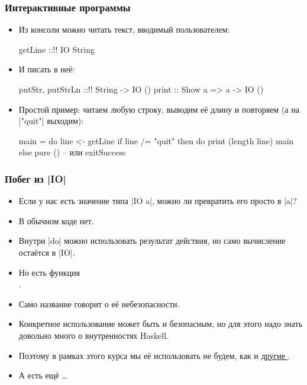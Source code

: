 \documentclass[11pt]{beamer}
\begin{document}
\begin{frame}[fragile]
  \frametitle{Интерактивные программы}
  \begin{itemize}
    \item Из консоли можно читать текст, вводимый пользователем:
          \begin{haskell}
            getLine ::!\pause! IO String
          \end{haskell}
    \item И писать в неё:
          \begin{haskell}
            putStr, putStrLn ::!\pause! String -> IO ()
            print :: Show a => a -> IO () 
          \end{haskell}
          \pause
    \item Простой пример: читаем любую строку, выводим её длину и повторяем (а на \haskinline|"quit"| выходим):
          \pause
          \begin{haskellsmall}
            main = do
              line <- getLine
              if line /= "quit"
                then do
                  print (length line)
                  main
                else
                  pure ()  -- или exitSuccess
          \end{haskellsmall}
  \end{itemize}
\end{frame}

\begin{frame}[fragile]
  \frametitle{Побег из \haskinline|IO|}
  \begin{itemize}
    \item Если у нас есть значение типа \haskinline|IO a|, можно ли превратить его просто в \haskinline|a|?
          \pause
    \item В обычном коде нет.
          \pause
    \item Внутри \haskinline|do| можно использовать результат действия, но само вычисление остаётся в \haskinline|IO|.
    \item Но есть функция \\
          \href{https://hackage.haskell.org/package/base/docs/System-IO-Unsafe.html#v:unsafePerformIO}{}.
    \item Само название говорит о её небезопасности.
    \item Конкретное использование может быть и безопасным, но для этого надо знать довольно много о внутренностях Haskell.
          \pause
    \item Поэтому в рамках этого курса мы её использовать не будем, как и \href{https://hackage.haskell.org/package/base/docs/System-IO-Unsafe.html}{другие }.
    \item А есть ещё \href{https://hackage.haskell.org/package/bytestring/docs/Data-ByteString-Internal.html#v:accursedUnutterablePerformIO}{}\ldots
  \end{itemize}
\end{frame}
\end{document}
